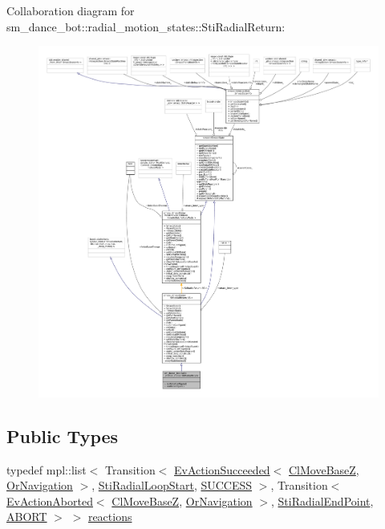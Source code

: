 Collaboration diagram for sm\+\_\+dance\+\_\+bot\+:\+:radial\+\_\+motion\+\_\+states\+:\+:Sti\+Radial\+Return\+:
\nopagebreak
\begin{figure}[H]
\begin{center}
\leavevmode
\includegraphics[width=350pt]{structsm__dance__bot_1_1radial__motion__states_1_1StiRadialReturn__coll__graph}
\end{center}
\end{figure}
\subsection*{Public Types}
\begin{DoxyCompactItemize}
\item 
typedef mpl\+::list$<$ Transition$<$ \hyperlink{structsmacc_1_1default__events_1_1EvActionSucceeded}{Ev\+Action\+Succeeded}$<$ \hyperlink{classcl__move__base__z_1_1ClMoveBaseZ}{Cl\+Move\+BaseZ}, \hyperlink{classsm__dance__bot_1_1OrNavigation}{Or\+Navigation} $>$, \hyperlink{structsm__dance__bot_1_1radial__motion__states_1_1StiRadialLoopStart}{Sti\+Radial\+Loop\+Start}, \hyperlink{structsmacc_1_1default__transition__tags_1_1SUCCESS}{S\+U\+C\+C\+E\+SS} $>$, Transition$<$ \hyperlink{structsmacc_1_1default__events_1_1EvActionAborted}{Ev\+Action\+Aborted}$<$ \hyperlink{classcl__move__base__z_1_1ClMoveBaseZ}{Cl\+Move\+BaseZ}, \hyperlink{classsm__dance__bot_1_1OrNavigation}{Or\+Navigation} $>$, \hyperlink{structsm__dance__bot_1_1radial__motion__states_1_1StiRadialEndPoint}{Sti\+Radial\+End\+Point}, \hyperlink{structsmacc_1_1default__transition__tags_1_1ABORT}{A\+B\+O\+RT} $>$ $>$ \hyperlink{structsm__dance__bot_1_1radial__motion__states_1_1StiRadialReturn_a248301e59a9c4f95c9db5349c336ddbc}{reactions}
\end{DoxyCompactItemize}
